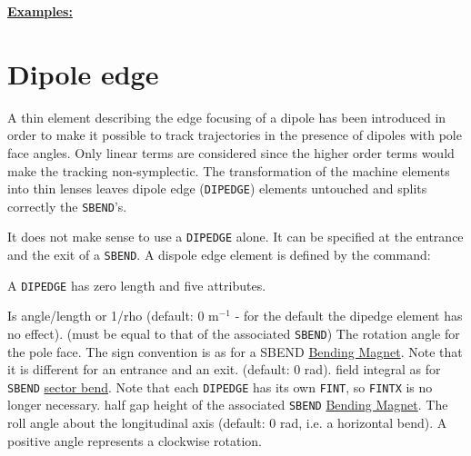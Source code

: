 {\bf \underline {Examples:}}



\section{Dipole edge}
\label{sec:dipedge}

A thin element describing the edge focusing of a dipole has been
introduced in order to make it possible to track trajectories in the
presence of dipoles with pole face angles. Only linear terms are
considered since the higher order terms would make the tracking
non-symplectic. The transformation of the machine elements into thin
lenses leaves dipole edge ({\tt DIPEDGE}) elements untouched and splits 
correctly the {\tt SBEND}'s.  

It does not make sense to use a {\tt DIPEDGE} alone. 
It can be specified at the entrance and the exit of a {\tt SBEND}. 
A dispole edge element is defined by the command:  

A {\tt DIPEDGE} has zero length and five attributes. 
\begin{madlist}
    Is angle/length or 1/rho (default: 0 m$^{-1}$ - for the
     default the dipedge element has no effect). (must be equal to that
     of the associated {\tt SBEND})  
    The rotation angle for the pole face. The sign convention is
     as for a SBEND \href{bend.html}{Bending Magnet}. Note that it is
     different for an entrance and an exit. (default: 0 rad).  
    field integral as for {\tt SBEND}
     \href{local_system.html#sbend}{sector bend}. Note that each {\tt DIPEDGE}
     has its own {\tt FINT}, so {\tt FINTX} is no longer necessary.  
    half gap height of the associated {\tt SBEND}
     \hyperref[sec:sbend]{Bending Magnet}.   
    The roll angle about the longitudinal axis (default: 0
     rad, i.e. a horizontal bend). A positive angle represents a
     clockwise rotation.  
\end{madlist}



